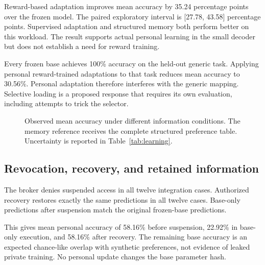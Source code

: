 \documentclass[11pt]{article}
\begin{document}
Reward-based adaptation improves mean accuracy by 35.24 percentage points over the frozen model.
The paired exploratory interval is [27.78, 43.58] percentage points.
Supervised adaptation and structured memory both perform better on this workload.
The result supports actual personal learning in the small decoder but does not establish a need for reward training.

Every frozen base achieves 100\% accuracy on the held-out generic task.
Applying personal reward-trained adaptations to that task reduces mean accuracy to 30.56\%.
Personal adaptation therefore interferes with the generic mapping.
Selective loading is a proposed response that requires its own evaluation, including attempts to trick the selector.

\begin{figure}[ht]
\centering
{}
\caption{Observed mean accuracy under different information conditions. The memory reference receives the complete structured preference table. Uncertainty is reported in Table~\ref{tab:learning}.}
\end{figure}

\subsection{Revocation, recovery, and retained information}
The broker denies suspended access in all twelve integration cases.
Authorized recovery restores exactly the same predictions in all twelve cases.
Base-only predictions after suspension match the original frozen-base predictions.

This gives mean personal accuracy of 58.16\% before suspension, 22.92\% in base-only execution, and 58.16\% after recovery.
The remaining base accuracy is an expected chance-like overlap with synthetic preferences, not evidence of leaked private training.
No personal update changes the base parameter hash.
\end{document}
